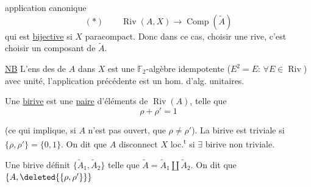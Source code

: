 
application canonique
\[
(*)\qquad \operatorname{Riv}(A,X)\longrightarrow\operatorname{Comp}(\widetilde A)
\]
qui est  \uline{bijective} si $X$ paracompact.
Donc dans ce cas, choisir une rive, c'est choisir un composant de $\widetilde A$.

\uline{NB} L'ens des  de  $A$ dans $X$ est une $\mathbb F_2$-algèbre  idempotente ($E^2=E$: $\forall E\in\operatorname{Riv}$) avec unité, l'application précédente est un hom. d'alg. unitaires.

Une \uline{birive}  est une \uline{paire}  d'éléments de $\operatorname{Riv}(A)$, telle que
\[
\rho+\rho'=1
\]

 (ce qui implique, si $A$ n'est pas ouvert, que $\rho\ne\rho'$).
La birive est triviale si $\{\rho,\rho'\}=\{0,1\}$. On dit que $A$ disconnect $X$ loc.\textsuperscript{t} si $\exists$ birive non triviale.

 Une birive définit $\{\widetilde A_1,\widetilde A_2\}$ telle que $\widetilde A=\widetilde A_1\amalg\widetilde A_2$.
On dit que  $\{A,\deleted{\{\rho,\rho'\}}\}$

